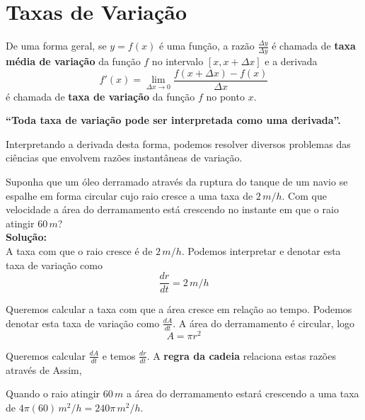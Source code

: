 \cleardoublepage\documentclass[../main.tex]{subfiles}
\begin{document}
\section{Taxas de Variação}\hypertarget{TaxaVar}{}\label{sec:taxaVariac}
De uma forma geral, se $y = f ( x )$ é uma função, a razão $\frac{\Delta y}{\Delta y}$ é chamada de \textbf{taxa média de variação} da função $f$ no intervalo $[ x, x + \Delta x ]$ e a derivada $$f'(x)=\lim_{\Delta x\to 0}\frac{f(x+\Delta x)-f(x)}{\Delta x}$$ é chamada de \textbf{taxa de variação} da função $f$ no ponto $x$.
\begin{center}
   \textbf{ “Toda taxa de variação pode ser interpretada como uma derivada”.}
\end{center}


Interpretando a derivada desta forma, podemos resolver diversos problemas das ciências que 
envolvem razões instantâneas de variação. 
\begin{ex}
 Suponha que um óleo derramado através da ruptura do tanque de um navio se espalhe em forma circular cujo raio cresce a uma taxa de $2\, m/h$. Com que velocidade a área do derramamento está crescendo no instante em que o raio atingir $60\, m$?\\
 \textbf{Solução:}\\
 A taxa com que o raio cresce é de $2\, m/h$. Podemos interpretar e denotar esta taxa de variação como $$\frac{dr}{dt}=2\, m/h$$
 
Queremos calcular a taxa com que a área cresce em relação ao tempo. Podemos denotar esta taxa de variação como $\frac{dA}{dt}$. A área do derramamento é circular, logo $$A = \pi r^2$$ 

Queremos calcular $\frac{dA}{dt}$  e temos $\frac{dr}{dt}$. A \textbf{regra da cadeia} relaciona estas razões através de 
Assim,

Quando o raio atingir $60\, m$ a área do derramamento  estará crescendo a uma taxa de $4\pi (60)\,  m^2/h=240\pi\, m^2/h$.
\end{ex}
\end{document}

